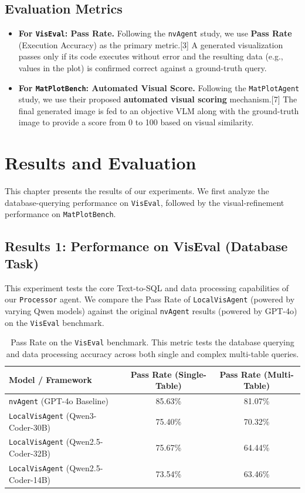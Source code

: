 \documentclass[a4paper,oneside,bibliography=totoc]{scrbook}
\begin{document}
\section{Evaluation Metrics}
\label{sec:metrics}

\begin{itemize}
 \item \textbf{For \texttt{VisEval}: Pass Rate.} Following the \texttt{nvAgent} study, we use \textbf{Pass Rate} (Execution Accuracy) as the primary metric.[3] A generated visualization passes only if its code executes without error and the resulting data (e.g., values in the plot) is confirmed correct against a ground-truth query.
 \item \textbf{For \texttt{MatPlotBench}: Automated Visual Score.} Following the \texttt{MatPlotAgent} study, we use their proposed \textbf{automated visual scoring} mechanism.[7] The final generated image is fed to an objective VLM along with the ground-truth image to provide a score from 0 to 100 based on visual similarity.
\end{itemize}

\chapter{Results and Evaluation}

This chapter presents the results of our experiments. We first analyze the database-querying performance on \texttt{VisEval}, followed by the visual-refinement performance on \texttt{MatPlotBench}. 

\section{Results 1: Performance on VisEval (Database Task)}
\label{sec:results_viseval}

This experiment tests the core Text-to-SQL and data processing capabilities of our \texttt{Processor} agent. We compare the Pass Rate of \texttt{LocalVisAgent} (powered by varying Qwen models) against the original \texttt{nvAgent} results (powered by GPT-4o) on the \texttt{VisEval} benchmark.

\begin{table}[tb]
 \centering
 \begin{tabular}{lcc}
 \toprule
 \textbf{Model / Framework} & \textbf{Pass Rate (Single-Table)} & \textbf{Pass Rate (Multi-Table)} \\
 \midrule
 \texttt{nvAgent} (GPT-4o Baseline) & 85.63\% & 81.07\% \\
 \texttt{LocalVisAgent} (Qwen3-Coder-30B) & 75.40\% & 70.32\% \\
 \texttt{LocalVisAgent} (Qwen2.5-Coder-32B) & 75.67\% & 64.44\% \\
 \texttt{LocalVisAgent} (Qwen2.5-Coder-14B) & 73.54\% & 63.46\% \\
 \bottomrule
 \end{tabular}
 \caption{Pass Rate on the \texttt{VisEval} benchmark. This metric tests the database querying and data processing accuracy across both single and complex multi-table queries.}
 \label{tab:viseval_results}
\end{table}
\end{document}
